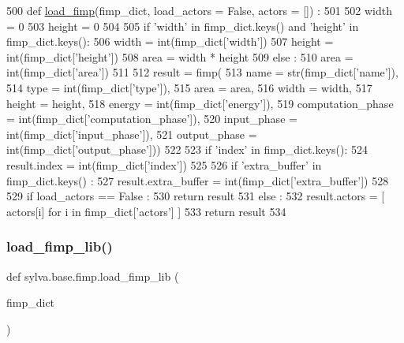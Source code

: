 \begin{DoxyCode}
500 \textcolor{keyword}{def }\hyperlink{namespacesylva_1_1base_1_1fimp_a49222336c8f368ae3381e7b8b456a8b4}{load\_fimp}(fimp\_dict, load\_actors = False, actors = []) :
501 
502   width = 0
503   height = 0
504 
505   \textcolor{keywordflow}{if} \textcolor{stringliteral}{'width'} \textcolor{keywordflow}{in} fimp\_dict.keys() \textcolor{keywordflow}{and} \textcolor{stringliteral}{'height'} \textcolor{keywordflow}{in} fimp\_dict.keys():
506     width = int(fimp\_dict[\textcolor{stringliteral}{'width'}])
507     height = int(fimp\_dict[\textcolor{stringliteral}{'height'}])
508     area = width * height
509   \textcolor{keywordflow}{else} :
510     area = int(fimp\_dict[\textcolor{stringliteral}{'area'}])
511 
512   result = fimp(
513     name = str(fimp\_dict[\textcolor{stringliteral}{'name'}]),
514     type = int(fimp\_dict[\textcolor{stringliteral}{'type'}]),
515     area = area,
516     width = width,
517     height = height,
518     energy = int(fimp\_dict[\textcolor{stringliteral}{'energy'}]),
519     computation\_phase = int(fimp\_dict[\textcolor{stringliteral}{'computation\_phase'}]),
520     input\_phase = int(fimp\_dict[\textcolor{stringliteral}{'input\_phase'}]),
521     output\_phase = int(fimp\_dict[\textcolor{stringliteral}{'output\_phase'}]))
522 
523   \textcolor{keywordflow}{if} \textcolor{stringliteral}{'index'} \textcolor{keywordflow}{in} fimp\_dict.keys():
524     result.index = int(fimp\_dict[\textcolor{stringliteral}{'index'}])
525 
526   \textcolor{keywordflow}{if} \textcolor{stringliteral}{'extra\_buffer'} \textcolor{keywordflow}{in} fimp\_dict.keys() :
527     result.extra\_buffer = int(fimp\_dict[\textcolor{stringliteral}{'extra\_buffer'}])
528 
529   \textcolor{keywordflow}{if} load\_actors == \textcolor{keyword}{False} :
530     \textcolor{keywordflow}{return} result
531   \textcolor{keywordflow}{else} :
532     result.actors = [ actors[i] \textcolor{keywordflow}{for} i \textcolor{keywordflow}{in} fimp\_dict[\textcolor{stringliteral}{'actors'}] ]
533     \textcolor{keywordflow}{return} result
534 
\end{DoxyCode}
\mbox{\label{namespacesylva_1_1base_1_1fimp_a57a8b55e554c3c8977bdca59b12fde4f}} 
\subsubsection{\texorpdfstring{load\+\_\+fimp\+\_\+lib()}{load\_fimp\_lib()}}
{\footnotesize\ttfamily def sylva.\+base.\+fimp.\+load\+\_\+fimp\+\_\+lib (\begin{DoxyParamCaption}\item[{}]{fimp\+\_\+dict }\end{DoxyParamCaption})}



